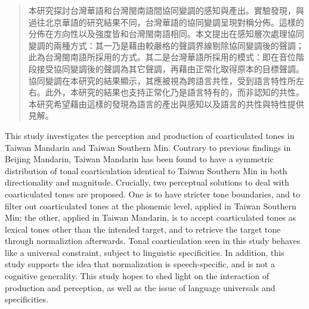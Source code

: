 
\begin{abstract}

本研究探討台灣華語和台灣閩南語間協同變調的感知與產出。實驗發現，與過往北京華語的研究結果不同，台灣華語的協同變調呈現對稱分佈。這樣的分佈在方向性以及強度皆和台灣閩南語相同。本文提出在感知層次處理協同變調的兩種方式：其一乃是藉由較嚴格的聲調界線剔除協同變調後的聲調；此為台灣閩南語所採用的方式。其二是台灣華語所採用的模式：即在音位階段接受協同變調後的聲調為其它聲調，再藉由正常化取得原本的目標聲調。
協同變調在本研究的結果顯示，其應被視為跨語言共性，受到語言特性所左右。此外，本研究的結果也支持正常化乃是語言特有的，而非認知的共性。本研究希望藉由這樣的發現為語言的產出與感知以及語言的共性與特性提供見解。

\end{abstract}

\begin{abstract*}

This study investigates the perception and production of coarticulated tones in Taiwan Mandarin and Taiwan Southern Min. Contrary to previous findings in Beijing Mandarin, Taiwan Mandarin has been found to have a symmetric distribution of tonal coarticulation identical to Taiwan Southern Min in both directionality and magnitude. Crucially, two perceptual solutions to deal with coarticulated tones are proposed. One is to have 
stricter tone boundaries, and to filter out coarticulated tones at the phonemic level, applied in Taiwan Southern Min; the other, applied in Taiwan Mandarin, is to accept coarticulated tones as lexical tones other than the intended target, and to retrieve the target tone through normaliztion afterwards. Tonal coarticulation seen in this study behaves like a universal constraint, subject to linguistic specificities. In addition, this study supports the idea that normalization is speech-specific, and is not a cognitive generality. This study hopes to shed light on the interaction of production and perception, as well as the issue of language universals and specificities.

\end{abstract*}